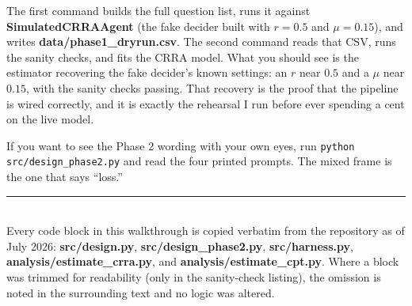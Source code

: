 \documentclass[11pt]{article}
\newcommand{\file}[1]{\textbf{\ttfamily #1}}
\begin{document}
The first command builds the full question list, runs it against \file{SimulatedCRRAAgent} (the fake
decider built with $r = 0.5$ and $\mu = 0.15$), and writes \file{data/phase1\_dryrun.csv}. The second
command reads that CSV, runs the sanity checks, and fits the CRRA model. What you should see is the
estimator recovering the fake decider's known settings: an $r$ near $0.5$ and a $\mu$ near $0.15$,
with the sanity checks passing. That recovery is the proof that the pipeline is wired correctly, and
it is exactly the rehearsal I run before ever spending a cent on the live model.

If you want to see the Phase 2 wording with your own eyes, run \verb|python src/design_phase2.py| and
read the four printed prompts. The mixed frame is the one that says ``loss.''

\vspace{8pt}
{\color{rulegray}\rule{\linewidth}{0.8pt}}\\[3pt]
{\footnotesize\color{mutegray} Every code block in this walkthrough is copied verbatim from the
repository as of July 2026: \file{src/design.py}, \file{src/design\_phase2.py}, \file{src/harness.py},
\file{analysis/estimate\_crra.py}, and \file{analysis/estimate\_cpt.py}. Where a block was trimmed for
readability (only in the sanity-check listing), the omission is noted in the surrounding text and no
logic was altered.}
\end{document}
